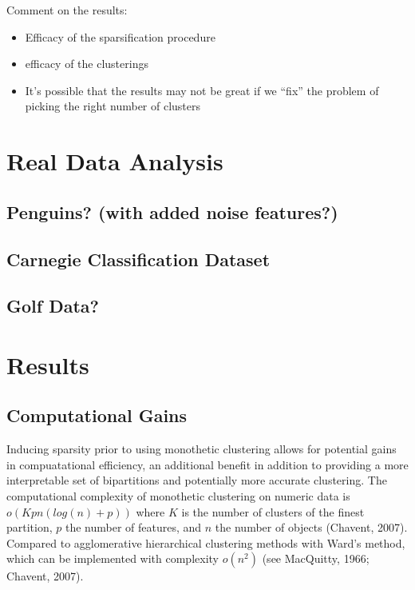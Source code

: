 \documentclass[
]{article}
\begin{document}
Comment on the results:

\begin{itemize}
\item
  Efficacy of the sparsification procedure
\item
  efficacy of the clusterings
\item
  It's possible that the results may not be great if we ``fix'' the
  problem of picking the right number of clusters
\end{itemize}

\hypertarget{real-data-analysis}{%
\section{Real Data Analysis}\label{real-data-analysis}}

\hypertarget{penguins-with-added-noise-features}{%
\subsection{Penguins? (with added noise
features?)}\label{penguins-with-added-noise-features}}

\hypertarget{carnegie-classification-dataset}{%
\subsection{Carnegie Classification
Dataset}\label{carnegie-classification-dataset}}

\hypertarget{golf-data}{%
\subsection{Golf Data?}\label{golf-data}}

\hypertarget{results}{%
\section{Results}\label{results}}

\hypertarget{computational-gains}{%
\subsection{Computational Gains}\label{computational-gains}}

Inducing sparsity prior to using monothetic clustering allows for
potential gains in compuatational efficiency, an additional benefit in
addition to providing a more interpretable set of bipartitions and
potentially more accurate clustering. The computational complexity of
monothetic clustering on numeric data is \(o(Kpn(log(n) + p))\) where
\(K\) is the number of clusters of the finest partition, \(p\) the
number of features, and \(n\) the number of objects (Chavent, 2007).
Compared to agglomerative hierarchical clustering methods with Ward's
method, which can be implemented with complexity \(o(n^2)\) (see
MacQuitty, 1966; Chavent, 2007).
\end{document}
